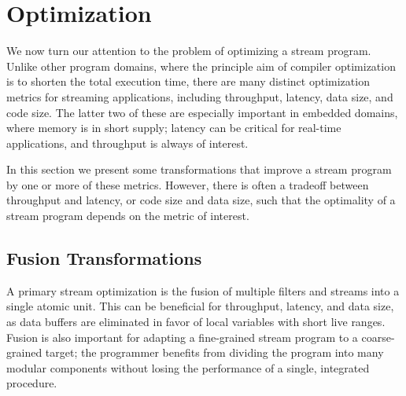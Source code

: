 \section{Optimization}
\label{sec:optimization}

We now turn our attention to the problem of optimizing a stream program.
Unlike other program domains, where the principle aim of compiler
optimization is to shorten the total execution time, there are many
distinct optimization metrics for streaming applications, including
throughput, latency, data size, and code size.  The latter two of these
are especially important in embedded domains, where memory is in short
supply; latency can be critical for real-time applications, and
throughput is always of interest.

%

In this section we present some transformations that improve a stream
program by one or more of these metrics.  However, there is often a
tradeoff between throughput and latency, or code size and data size,
such that the optimality of a stream program depends on the metric of
interest.

\subsection{Fusion Transformations}

A primary stream optimization is the fusion of multiple filters and
streams into a single atomic unit.  This can be beneficial for
throughput, latency, and data size, as data buffers are eliminated in
favor of local variables with short live ranges.  Fusion is also
important for adapting a fine-grained stream program to a
coarse-grained target; the programmer benefits from dividing the
program into many modular components without losing the performance of
a single, integrated procedure.

